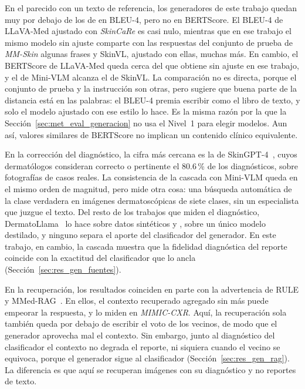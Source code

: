 En el parecido con un texto de referencia, los generadores de este trabajo quedan muy por debajo de los de
\textcite{zeng2025mmskin} en BLEU-4, pero no en BERTScore. El BLEU-4 de LLaVA-Med ajustado con \emph{SkinCaRe} es
casi nulo, mientras que en ese trabajo el mismo modelo sin ajuste comparte con las respuestas del conjunto de prueba de \emph{MM-Skin} algunas frases y
SkinVL, ajustado con ellas, muchas más. En cambio, el BERTScore de LLaVA-Med queda cerca del que obtiene sin ajuste en
ese trabajo, y el de Mini-VLM alcanza el de SkinVL. La comparación no es directa, porque el conjunto de prueba y la instrucción
son otras, pero sugiere que buena parte de la distancia está en las palabras: el BLEU-4 premia escribir como el
libro de texto, y solo el modelo ajustado con ese estilo lo hace. Es la misma razón por la que la
Sección~\ref{sec:met_eval_generacion} no usa el Nivel~1 para elegir modelos. Aun así, valores similares de BERTScore no implican un contenido clínico
equivalente.

En la corrección del diagnóstico, la cifra más cercana es la de SkinGPT-4~\cite{zhou2024pretrained}, cuyos
dermatólogos consideran correcto o pertinente el 80.6\,\% de los diagnósticos, sobre fotografías de casos reales. La
consistencia de la cascada con Mini-VLM queda en el mismo orden de magnitud, pero mide otra cosa: una búsqueda automática de la
clase verdadera en imágenes dermatoscópicas de siete clases, sin un especialista que juzgue el texto. Del resto de los
trabajos que miden el diagnóstico, DermatoLlama~\cite{yilmaz2025resourceefficient} lo hace sobre datos sintéticos y
\textcite{chakrabarti2025skin}, sobre un único modelo destilado, y ninguno separa el aporte del clasificador del
generador. En este trabajo, en cambio, la cascada muestra que la fidelidad diagnóstica del reporte coincide con la exactitud del clasificador que lo ancla (Sección~\ref{sec:res_gen_fuentes}).

En la recuperación, los resultados coinciden en parte con la advertencia de RULE y MMed-RAG~\cite{xia2024rule,
xia2025mmedrag}. En ellos, el contexto recuperado agregado sin más puede empeorar la respuesta, y \textcite{xia2024rule}
lo miden en \emph{MIMIC-CXR}. Aquí, la recuperación sola también queda por debajo de escribir el voto de los vecinos, de
modo que el generador aprovecha mal el contexto. Sin embargo, junto al diagnóstico del clasificador el contexto no
degrada el reporte, ni siquiera cuando el vecino se equivoca, porque el generador sigue al clasificador
(Sección~\ref{sec:res_gen_rag}). La diferencia es que aquí se recuperan imágenes con su diagnóstico y no reportes de
texto.

